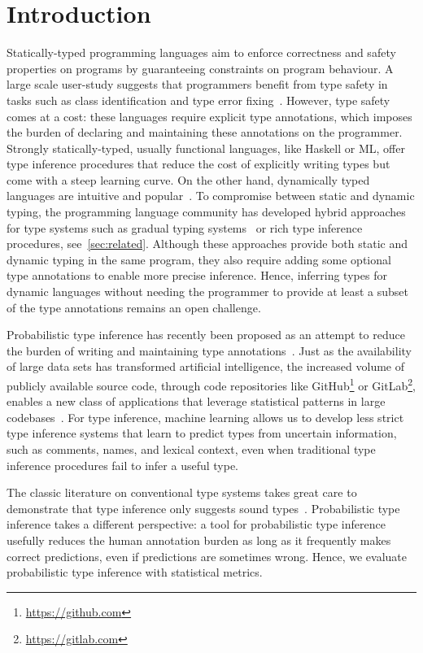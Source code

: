 \documentclass[sigplan,10pt,review,anonymous]{acmart} %
\theoremstyle{plain}
\theoremstyle{remark}
\theoremstyle{definition}
\begin{document}
\section{Introduction}
Statically-typed programming languages aim to enforce correctness and safety  properties
on programs by guaranteeing constraints on program behaviour.
A large scale user-study
suggests that programmers
benefit from type safety in tasks
such as class identification and type error fixing~\citep{hanenberg14,gao17}.
However, type safety comes at a cost: these languages require explicit type annotations,
which imposes the burden of declaring and maintaining these annotations on the programmer.
Strongly statically-typed, usually functional languages, like Haskell or ML,
offer type inference procedures that reduce
the cost of explicitly writing types but come with
a steep learning curve.
On the other hand, dynamically typed languages are intuitive
and popular~\cite{meyerovich12}.
To compromise between static and dynamic typing,
the programming language community has developed hybrid approaches for type systems
such as gradual typing systems~\cite{siek06} or rich type inference procedures, see~\cref{sec:related}.
Although these approaches provide both static and dynamic typing in the same program,
they also require adding some optional type annotations to enable more precise inference.
Hence, inferring types for dynamic
languages without needing the programmer to provide at least a subset of
the type annotations remains an open challenge.

Probabilistic type inference
has recently been proposed as an attempt to reduce the burden
of writing and maintaining type
annotations~\cite{raychev15,xu16,hellendoorn18}.
Just as the availability of large data sets has transformed artificial intelligence,
the increased volume of publicly available source code, through
code repositories like GitHub\footnote{\href{https://github.com}{https://github.com}}
or GitLab\footnote{\href{https://gitlab.com}{https://gitlab.com}},
enables a new class of applications that leverage statistical
patterns in large codebases~\cite{allamanis17}.
For type inference, machine learning
allows us to develop less strict type inference systems
that learn to predict types from uncertain information,
such as comments, names, and lexical context,
even when traditional type inference procedures
fail to infer a useful type.

The classic literature on conventional type systems takes great care to demonstrate
that type inference only suggests sound types~\cite{DBLP:journals/jcss/Milner78,Pierce2002}.
Probabilistic type inference takes a different perspective:
a tool for probabilistic type inference usefully reduces the human annotation burden
as long as it frequently makes correct predictions, even if predictions are sometimes wrong.
Hence, we evaluate probabilistic type inference with statistical metrics.
\end{document}
